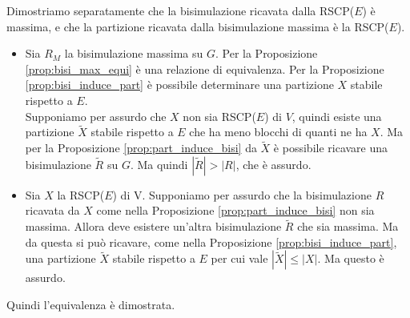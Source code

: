 \begin{proof2}
    Dimostriamo separatamente che la bisimulazione ricavata dalla RSCP($E$) è massima, e che la partizione ricavata dalla bisimulazione massima è la RSCP($E$).
    \begin{itemize}
        \item Sia $R_M$ la bisimulazione massima su $G$. Per la Proposizione \ref{prop:bisi_max_equi} è una relazione di equivalenza. Per la Proposizione \ref{prop:bisi_induce_part} è possibile determinare una partizione $X$ stabile rispetto a $E$.\\
              Supponiamo per assurdo che $X$ non sia RSCP($E$) di $V$, quindi esiste una partizione $\widetilde{X}$ stabile rispetto a $E$ che ha meno blocchi di quanti ne ha $X$. Ma per la Proposizione \ref{prop:part_induce_bisi} da
              $\widetilde{X}$ è possibile ricavare una bisimulazione $\widetilde{R}$ su $G$. Ma quindi $|\widetilde{R}| > |R|$, che è assurdo.
        \item Sia $X$ la RSCP($E$) di V. Supponiamo per assurdo che la bisimulazione $R$ ricavata da $X$ come nella Proposizione \ref{prop:part_induce_bisi} non sia massima. Allora deve esistere un'altra bisimulazione $\widetilde{R}$ che
              sia massima. Ma da questa si può ricavare, come nella Proposizione \ref{prop:bisi_induce_part}, una partizione $\widetilde{X}$ stabile rispetto a $E$ per cui vale $|\widetilde{X}| \leq |X|$. Ma questo è assurdo.
    \end{itemize}
    Quindi l'equivalenza è dimostrata.
\end{proof2}
